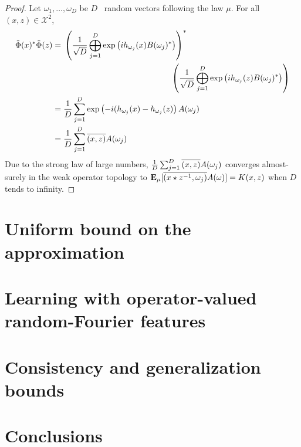 \begin{proof}
Let $\omega_1, \ldots, \omega_D$ be $D$ \iid~random vectors following the law $\mu$. For all $(x,z) \in \mathcal{X}^2$, 
\begin{equation*}
\begin{aligned}
\tildePhi(x)^*\tildePhi(z)&= \!\begin{multlined}[t][.8\textwidth] \left(\frac{1}{\sqrt{D}}\Vect_{j=1}^D \exp\left(ih_{\omega_j}(x)B(\omega_j)^*\right)\right)^* {}\\ \left(\frac{1}{\sqrt{D}}\Vect_{j=1}^D \exp\left(ih_{\omega_j}(z)B(\omega_j)^*\right)\right) \end{multlined}\\
&= \frac{1}{D} \sum_{j=1}^D \exp\left(-i(h_{\omega_j}(x)-h_{\omega_j}(z)\right) A(\omega_j)\\
&= \frac{1}{D} \sum_{j=1}^D \conj{\pairing{x,z}}A(\omega_j)
\end{aligned}
\end{equation*}
Due to the strong law of large numbers, $ \frac{1}{D} \sum_{j=1}^D \overline{(x,z)}A(\omega_j)$ 
converges almost-surely in the weak operator topology to ${\text{\bf E}}_{\mu}[\overline{(x\star z^{-1},\omega_j)}A(\omega) ]=K(x,z)$ when $D$ tends to infinity.
\end{proof}

\section{Uniform bound on the approximation}
\label{sec:uniform_bound_on_the_approximation}

\section{Learning with operator-valued random-Fourier features}
\label{sec:learning_with_operator-valued_random-fourier_features}

\section{Consistency and generalization bounds}
\label{sec:consistency and generalization bounds}

\section{Conclusions}
\label{sec:conclusions}

